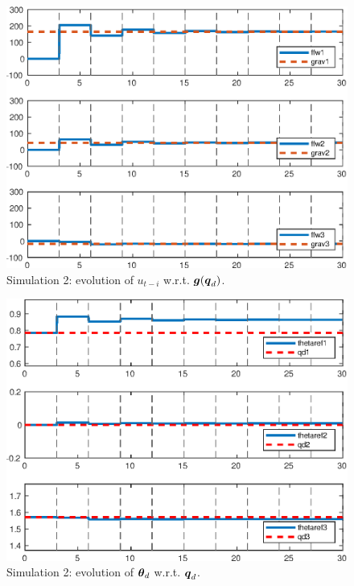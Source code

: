 \begin{center}
\begin{figure}[!h]
\centerline{\includegraphics[scale=0.65]{figures/2_1_grcomp.eps}}
\caption{\label{2_1gravff}
Simulation 2: evolution of $u_{t-i}$ w.r.t. $\boldsymbol{g}({\boldsymbol{q}}_d)$.}
\end{figure}

\begin{figure}[!h]
\centerline{\includegraphics[scale=0.65]{figures/2_1_thetaref.eps}}
\caption{\label{2_1tqd}
Simulation 2: evolution of $\boldsymbol{\theta}_d$ w.r.t. ${\boldsymbol{q}}_d$.}
\end{figure}


\end{center}
